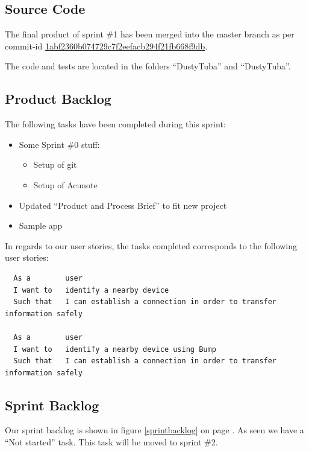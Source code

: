 \documentclass[a4paper,11pt]{article}
\begin{document}

\subsection{Source Code}

The final product of sprint \#1 has been merged into the master branch as per commit-id  \href{https://github.com/omegahm/DBP2P/commit/1abf2360b074729c7f2eefacb294f21fb668f9db}{1abf2360b074729c7f2eefacb294f21fb668f9db}.

The code and tests are located in the folders ``DustyTuba'' and ``DustyTuba''.

\subsection{Product Backlog}
The following tasks have been completed during this sprint:
\begin{itemize}
	\item Some Sprint \#0 stuff:
	\begin{itemize}
		\item Setup of git
		\item Setup of Acunote
	\end{itemize}
	\item Updated ``Product and Process Brief'' to fit new project
	\item Sample app
\end{itemize}

In regards to our user stories, the tasks completed corresponds to the following user stories:
\begin{verbatim}
  As a        user
  I want to   identify a nearby device
  Such that   I can establish a connection in order to transfer information safely	

  As a        user
  I want to   identify a nearby device using Bump
  Such that   I can establish a connection in order to transfer information safely
\end{verbatim}

\subsection{Sprint Backlog}
Our sprint backlog is shown in figure \ref{sprintbacklog} on page \pageref{sprintbacklog}.
As seen we have a ``Not started'' task. 
This task will be moved to sprint \#2.
\end{document}
